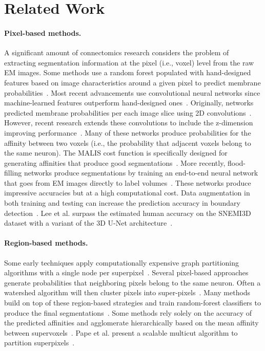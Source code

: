 
\section{Related Work}

\paragraph{Pixel-based methods.}
A significant amount of connectomics research considers the problem of extracting segmentation information at the pixel (i.e., voxel) level from the raw EM images. 
Some methods use a random forest populated with hand-designed features based on image characteristics around a given pixel to predict membrane probabilities~\cite{kaynig2015large}.
Most recent advancements use convolutional neural networks since machine-learned features outperform hand-designed ones~\cite{bogovic2013learned}.
Originally, networks predicted membrane probabilities per each image slice using 2D convolutions~\cite{seymour2016rhoananet,ronneberger2015u,ciresan2012deep,jain2010boundary,kaynig2015large,amelio_segmentation}.
However, recent research extends these convolutions to include the z-dimension improving performance~\cite{lee2015recursive,parag2017anisotropic,cciccek20163d,turaga2010convolutional}.
Many of these networks produce probabilities for the affinity between two voxels (i.e., the probability that adjacent voxels belong to the same neuron). 
The MALIS cost function is specifically designed for generating affinities that produce good segmentations~\cite{briggman2009maximin}. 
More recently, flood-filling networks produce segmentations by training an end-to-end neural network that goes from EM images directly to label volumes~\cite{januszewski2016flood}. 
These networks produce impressive accuracies but at a high computational cost.
Data augmentation in both training and testing can increase the prediction accuracy in boundary detection~\cite{zeng2017deepem3d}.
Lee et al. surpass the estimated human accuracy on the SNEMI3D dataset with a variant of the 3D U-Net architecture~\cite{lee2017superhuman}.

\paragraph{Region-based methods.}

Some early techniques apply computationally expensive graph partitioning algorithms with a single node per superpixel~\cite{andres2012globally}. 
Several pixel-based approaches generate probabilities that neighboring pixels belong to the same neuron.
Often a watershed algorithm will then cluster pixels into super-pixels~\cite{zlateski2015image}.
Many methods build on top of these region-based strategies and train random-forest classifiers to produce the final segmentations~\cite{seymour2016rhoananet,nunez2014graph,parag2017anisotropic,zlateski2015image,10.1371/journal.pone.0125825}.
Some methods rely solely on the accuracy of the predicted affinities and agglomerate hierarchically based on the mean affinity between supervoxels~\cite{lee2017superhuman,funke2017deep}.
Pape et al. present a scalable multicut algorithm to partition superpixels~\cite{beier2017multicut}.

